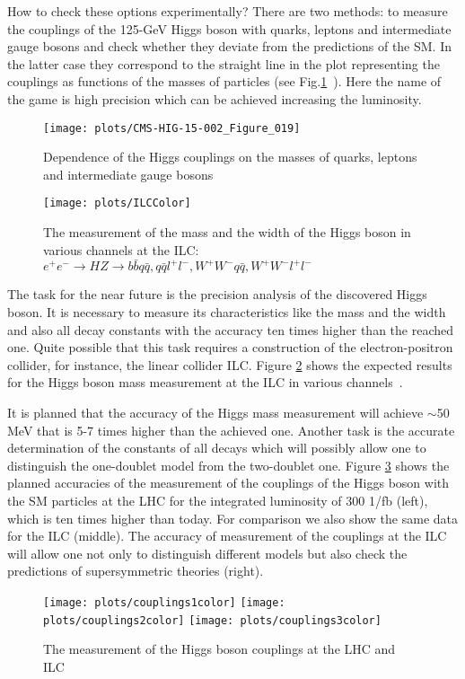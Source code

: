\documentclass{cernyrep}
\begin{document}
How to check these options experimentally? There are two methods: to measure the couplings of the 125-GeV Higgs boson with quarks, leptons and intermediate gauge bosons and check whether they deviate from the predictions of the SM. In the latter case they correspond to the straight line in the plot representing the couplings as functions of the masses of particles (see Fig.\ref{couplings}~\cite{ATLAS_Higgs}). Here the name of the game is high precision which can be achieved increasing the luminosity. 
\begin{figure}[htb]
\centering
\texttt{[image: plots/CMS-HIG-15-002\_Figure\_019]}
\caption{Dependence of the Higgs couplings on the masses of quarks, leptons and intermediate gauge bosons}
\label{couplings}
\end{figure} 



\begin{figure}[htb]
\begin{center}\vspace{-0.2cm}
\leavevmode
\texttt{[image: plots/ILCColor]}
\end{center}\vspace{-0.2cm}
\caption{The measurement of the mass and the width of the Higgs boson in various channels at the ILC:
$e^+e^-\to HZ\to b\bar b q\bar q,  q\bar q l^+l^-, W^+W^-q\bar q,  W^+W^-l^+l^-$ }
\label{ILC}
\end{figure}
The task for the near future is the precision analysis of the discovered Higgs boson. It is necessary to measure its characteristics  like the mass and the width and also all decay constants with the accuracy  ten times higher than the reached one. Quite possible that this task requires a construction of the electron-positron collider, for instance,  the linear collider ILC.  Figure \ref{ILC} shows the expected results for the Higgs boson mass measurement at the ILC in various channels~\cite{ILC}. 

It is planned that the accuracy of the Higgs mass measurement  will achieve $\sim$50  MeV that is 5-7 times higher than the achieved one.  Another task is the accurate determination of the constants of all decays which will possibly allow one to distinguish the one-doublet model from the two-doublet one. Figure \ref{ILCH} shows the planned accuracies of the measurement of the couplings of the Higgs boson with the SM particles at the LHC for the integrated luminosity   of
300 1/fb (left), which is ten times higher than today.  For comparison we also show the same data for the ILC (middle). The accuracy of measurement of the couplings at the ILC will allow one  not only to distinguish different models but also check the predictions of supersymmetric theories (right).
 \begin{figure}[ht]
\begin{center}
\leavevmode
\texttt{[image: plots/couplings1color]}
\texttt{[image: plots/couplings2color]}
\texttt{[image: plots/couplings3color]}
\end{center}
\caption{The measurement of the Higgs boson couplings at the LHC and ILC~\cite{LHC_ILC}}
\label{ILCH}
\end{figure}
\end{document}

